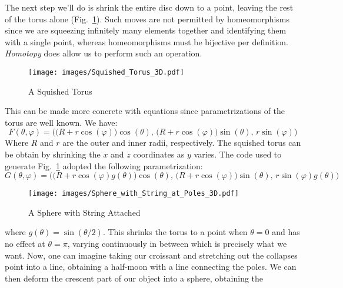 \documentclass{article}                                                        %
\begin{document}
        The next step we'll do is shrink the entire disc down to a point,
        leaving the rest of the torus alone (Fig.~\ref{fig:Squished_Torus}).
        Such moves are not permitted by homeomorphisms since we are squeezing
        infinitely many elements together and identifying them with a single
        point, whereas homeomorphisms must be bijective per definition.
        \textit{Homotopy} does allow us to perform such an operation.
        \begin{figure}[H]
            \centering
            \captionsetup{type=figure}
            \texttt{[image: images/Squished\_Torus\_3D.pdf]}
            \caption{A Squished Torus}
            \label{fig:Squished_Torus}
        \end{figure}
        This can be made more concrete with
        equations since parametrizations of the torus are well known. We have:
        \begin{equation}
            F(\theta,\varphi)=\Big(
                \big(R+r\cos(\varphi)\big)\cos(\theta),\,
                \big(R+r\cos(\varphi)\big)\sin(\theta),\,
                r\sin(\varphi)\Big)
        \end{equation}
        Where $R$ and $r$ are the outer and inner radii, respectively. The
        squished torus can be obtain by shrinking the $x$ and $z$ coordinates
        as $y$ varies. The code used to generate Fig.~\ref{fig:Squished_Torus}
        adopted the following parametrization:
        \begin{equation}
                G(\theta,\varphi)=\Big(
                    \big(R+r\cos(\varphi)g(\theta)\big)\cos(\theta),\,
                    \big(R+r\cos(\varphi)\big)\sin(\theta),\,
                    r\sin(\varphi)g(\theta)\Big)
        \end{equation}
        \begin{figure}[H]
            \centering
            \captionsetup{type=figure}
            \texttt{[image: images/Sphere\_with\_String\_at\_Poles\_3D.pdf]}
            \caption{A Sphere with String Attached}
            \label{fig:Sphere_with_String_Attached}
        \end{figure}
        where $g(\theta)=\sin(\theta/2)$. This shrinks the torus to a point when
        $\theta=0$ and has no effect at $\theta=\pi$, varying continuously in
        between which is precisely what we want. Now, one can imagine taking
        our croissant and stretching out the collapses point into a line,
        obtaining a half-moon with a line connecting the poles. We can then
        deform the crescent part of our object into a sphere, obtaining the
\end{document}
